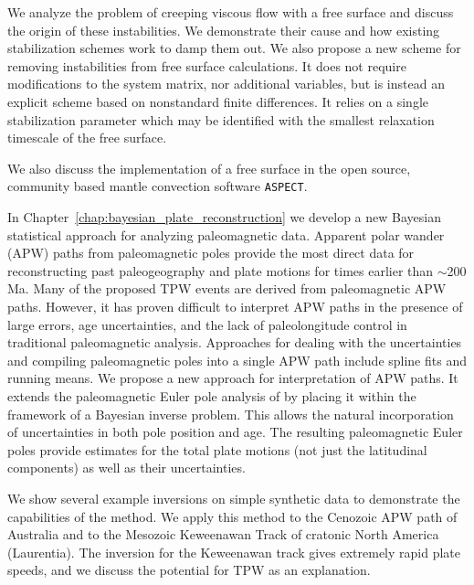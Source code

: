 We analyze the problem of creeping viscous flow with a free surface and discuss the 
origin of these instabilities. We demonstrate their cause and how existing stabilization 
schemes work to damp them out.
We also propose a new scheme for removing instabilities from free surface calculations. 
It does not require modifications to the system matrix, nor additional variables, but is instead
an explicit scheme based on nonstandard finite differences.  It relies on a single 
stabilization parameter which may be identified with the smallest relaxation timescale of the
free surface.

We also discuss the implementation of a free surface in the open source, community based
mantle convection software \texttt{ASPECT}.

In Chapter~\ref{chap:bayesian_plate_reconstruction} we develop a new Bayesian statistical approach
for analyzing paleomagnetic data.
Apparent polar wander (APW) paths from paleomagnetic poles provide the most direct data
for reconstructing past paleogeography and plate motions for times earlier than $\sim$200 Ma. 
Many of the proposed TPW events are derived from paleomagnetic APW paths.
However, it has proven difficult to interpret APW paths in the presence of large errors,
age uncertainties, and the lack of paleolongitude control in traditional paleomagnetic analysis.
Approaches for dealing with the uncertainties and compiling paleomagnetic poles 
into a single APW path include spline fits and running means.
We propose a new approach for interpretation of APW paths.
It extends the paleomagnetic Euler pole analysis of \citet{gordon1984paleomagnetic}
by placing it within the framework of a Bayesian inverse problem.
This allows the natural incorporation of uncertainties in both pole position and age.
The resulting paleomagnetic Euler poles provide estimates for the total
plate motions (not just the latitudinal components) as well as their uncertainties.

We show several example inversions on simple synthetic data to demonstrate the capabilities of the method.
We apply this method to the Cenozoic APW path of Australia and to the
Mesozoic Keweenawan Track of cratonic North America (Laurentia).
The inversion for the Keweenawan track gives extremely rapid plate speeds, and we discuss the potential for TPW as an explanation.

\nocite{newton1728principia}
